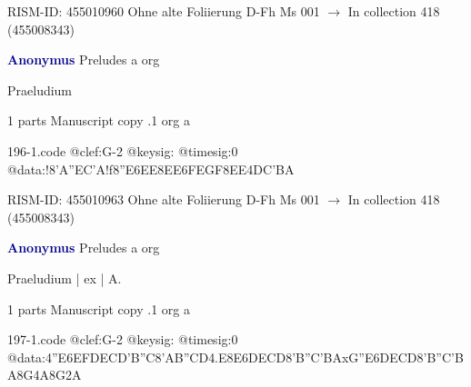 \documentclass[twocolumn]{book}
\begin{document}
\newline RISM-ID: 455010960
\newline Ohne alte Foliierung
\newline D-Fh  Ms 001
\newline $\rightarrow$ In collection 418 (455008343)

\newline \par \vspace{7pt} \textcolor{darkblue}{\textbf{Anonymus  }}
\newline Preludes  a  
\newline org
\newline \begin{itshape}[f.83v, at left:] Praeludium\end{itshape} 
\newline \textcolor{darkblue}{}  1 parts  
\newline Manuscript copy
.1  org  a  
\begin{filecontents*}{196-1.code}
@clef:G-2
@keysig:
@timesig:0
@data:!{8'A''EC'A}!f{8''E6EE}{8EE}{6FEGF}{8EE}4DC'BA
\end{filecontents*}
\newline
%

\newline RISM-ID: 455010963
\newline Ohne alte Foliierung
\newline D-Fh  Ms 001
\newline $\rightarrow$ In collection 418 (455008343)

\newline \par \vspace{7pt} \textcolor{darkblue}{\textbf{Anonymus  }}
\newline Preludes  a  
\newline org
\newline \begin{itshape}[f.87v, at left:] Praeludium | ex | A.\end{itshape} 
\newline \textcolor{darkblue}{}  1 parts  
\newline Manuscript copy
.1  org  a  
\begin{filecontents*}{197-1.code}
@clef:G-2
@keysig:
@timesig:0
@data:4''E{6EFDE}{CD'B''C}{8'AB}{''CD}4.E8E{6DECD}{8'B''C'BA}{xG''E}{6DECD}{8'B''C'BA}8G4A8G2A
\end{filecontents*}
\newline
%
\end{document}
